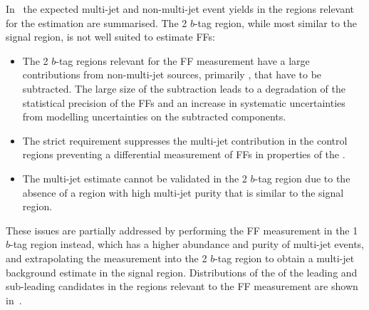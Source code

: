 In~ the expected multi-jet and non-multi-jet event
yields in the regions relevant for the \faketauhadvis estimation are
summarised. The 2 $b$-tag region, while most similar to the signal region, is
not well suited to estimate FFs:
\begin{itemize}

\item The 2 $b$-tag regions relevant for the FF measurement have a large
  contributions from non-multi-jet sources, primarily \ttbarFakes, that have to
  be subtracted. The large size of the subtraction leads to a degradation of the
  statistical precision of the FFs and an increase in systematic uncertainties
  from modelling uncertainties on the subtracted components.

\item The strict \btag requirement suppresses the multi-jet contribution in the
  control regions preventing a differential measurement of FFs in properties of
  the \tauhadvis.

\item The multi-jet estimate cannot be validated in the 2 $b$-tag
  region due to the absence of a region with high multi-jet purity
  that is similar to the signal region.

\end{itemize}
These issues are partially addressed by performing the FF measurement in the 1
$b$-tag region instead, which has a higher abundance and purity of multi-jet
events, and extrapolating the measurement into the 2 $b$-tag region to obtain a
multi-jet background estimate in the signal region. Distributions of the \pT of
the leading and sub-leading \tauhadvis candidates in the regions relevant to the
FF measurement are shown in~.


